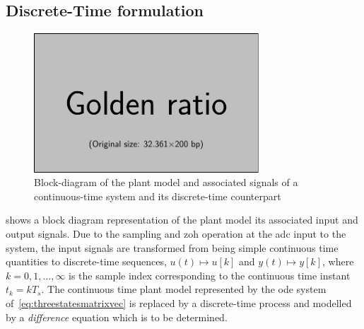 \subsection{Discrete-Time  formulation}

\begin{figure}[htb]
    \centering
    \includegraphics[width=0.75\textwidth]{placeholder_images/example-image-golden.pdf}
    \caption[Block-diagram of continuous and discrete-time systems]{Block-diagram of the plant model and associated signals of a continuous-time system and its discrete-time counterpart}
    \label{fig:blockdiagctsdisc}
\end{figure}

 shows  a block  diagram representation of  the plant
model its associated input and output signals. Due to the sampling and \gls{zoh}
operation  at  the  \gls{adc}  input  to  the  system,  the  input  signals  are
transformed  from  being  simple  continuous time  quantities  to  discrete-time
sequences,  \ie{} $u(t)  \mapsto  u[k]$  and $y(t)  \mapsto  y[k]$,  where $k  =
0,1,\dots,∞$ is the sample index  corresponding to the continuous time instant
$t_k  = kT_s$.  The continuous  time plant  model represented  by the  \gls{ode}
system of~\cref{eq:threestatesmatrixvec} is replaced  by a discrete-time process
and modelled by a \emph{difference} equation which is to be determined.

